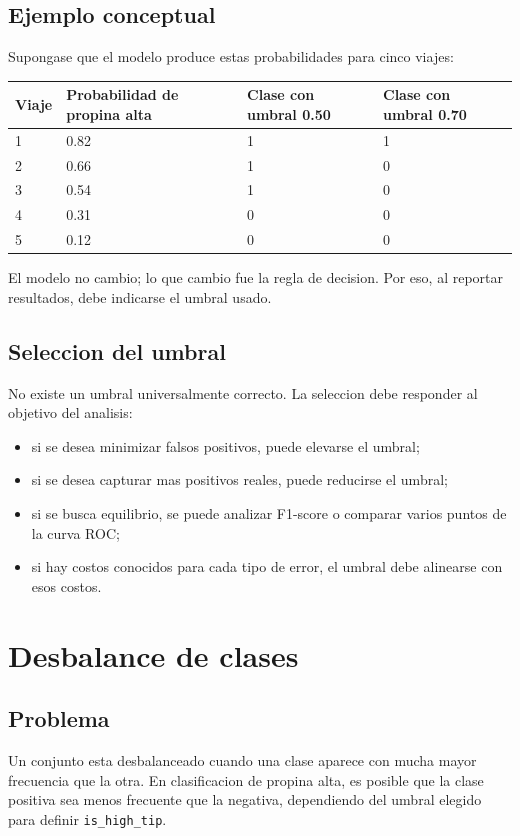 \documentclass[12pt]{article}
\begin{document}
\subsection{Ejemplo conceptual}
Supongase que el modelo produce estas probabilidades para cinco viajes:
\begin{longtable}{@{}p{} p{} p{} p{}@{}}
\toprule
\textbf{Viaje} & \textbf{Probabilidad de propina alta} & \textbf{Clase con umbral 0.50} & \textbf{Clase con umbral 0.70} \\
\midrule
\endhead
1 & 0.82 & 1 & 1 \\
2 & 0.66 & 1 & 0 \\
3 & 0.54 & 1 & 0 \\
4 & 0.31 & 0 & 0 \\
5 & 0.12 & 0 & 0 \\
\bottomrule
\end{longtable}

El modelo no cambio; lo que cambio fue la regla de decision. Por eso, al reportar resultados, debe indicarse el umbral usado.

\subsection{Seleccion del umbral}
No existe un umbral universalmente correcto. La seleccion debe responder al objetivo del analisis:
\begin{itemize}[leftmargin=*]
\item si se desea minimizar falsos positivos, puede elevarse el umbral;
\item si se desea capturar mas positivos reales, puede reducirse el umbral;
\item si se busca equilibrio, se puede analizar F1-score o comparar varios puntos de la curva ROC;
\item si hay costos conocidos para cada tipo de error, el umbral debe alinearse con esos costos.
\end{itemize}

\section{Desbalance de clases}
\subsection{Problema}
Un conjunto esta desbalanceado cuando una clase aparece con mucha mayor frecuencia que la otra. En clasificacion de propina alta, es posible que la clase positiva sea menos frecuente que la negativa, dependiendo del umbral elegido para definir \texttt{is\_high\_tip}.
\end{document}
